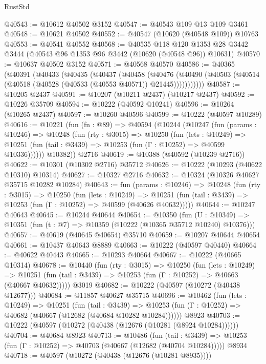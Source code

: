 \begin{lexlean}{RustStd}
\begin{coremodule}
@40543 := @10612 @40502 @3152
@40547 := @40543 @109 @13 @109 @3461
@40548 := @10621 @40502
@40552 := @40547 (@10620 (@40548 @109)) @10763
@40553 := @40541 @40552
@40568 := @40535
    @118
    @120
    @1353
    @28
    @3442
    @3444
    (@40543 @96 @1353 @96 @3442 (@10620 (@40548 @96)) @10631)
@40570 := @10637 @40502 @3152
@40571 := @40568 @40570
@40586 := @40365
    (@40391
      (@40433
        (@40435
          (@40437
            (@40458
              (@40476
                (@40490 (@40503 (@40514 (@40518 (@40528 (@40533 (@40553 @40571)) @21445)))))))))))
@40587 := @10205 @2437
@40591 := @10207 (@10211 @2437) (@10217 @2437)
@40592 := @10226 @35709
@40594 := @10222 (@40592 @10241)
@40596 := @10264 (@10265 @2437)
@40597 := @10260 @40596
@40599 := @10222 (@40597 @10289)
@40616 := @10221
    (fun (fn : @89) =>
    @40594
      (@10244
        (@10247
          (fun (params : @10246) =>
          @10248
            (fun (rty : @3015) =>
            @10250
              (fun (lets : @10249) =>
              @10251 (fun (tail : @3439) => @10253 (fun (Γ : @10252) => @40599 @10336))))))
        @10382))
    @2716
@40619 := @10388 (@40592 (@10239 @2716))
@40622 := @10301 (@10302 @2716) @35712
@40626 := @10222 (@10293 (@40622 @10310) @10314)
@40627 := @10327 @2716
@40632 := @10324 (@10326 @40627 @35715 @10282 @10284)
@40643 := fun (params : @10246) =>
  @10248
    (fun (rty : @3015) =>
    @10250
      (fun (lets : @10249) =>
      @10251 (fun (tail : @3439) => @10253 (fun (Γ : @10252) => @40599 (@40626 @40632)))))
@40644 := @10247 @40643
@40645 := @10244 @40644
@40654 := @10350
    (fun (U : @10349) => @10351 (fun (t : @7) => @10359 (@10222 (@10365 @35712 @10240) @10376)))
@40657 := @40619 (@40645 @40654) @35710
@40659 := @10207 @40644 @40654
@40661 := @10437 @40643 @8889
@40663 := @10222 (@40597 @40440)
@40664 := @40622 @40443
@40665 := @10293 @40664
@40667 := @10222 (@40665 @10314)
@40678 := @10440
    (fun (rty : @3015) =>
    @10250
      (fun (lets : @10249) =>
      @10251 (fun (tail : @3439) => @10253 (fun (Γ : @10252) => @40663 (@40667 @40632)))))
    @3019
@40682 := @10222 (@40597 (@10272 (@40438 @12677)))
@40684 := @11857 @40627 @35715
@40696 := @10462
    (fun (lets : @10249) =>
    @10251
      (fun (tail : @3439) =>
      @10253 (fun (Γ : @10252) => @40682 (@40667 (@12682 (@40684 @10282 @10284))))))
    @8923
@40703 := @10222 (@40597 (@10272 (@40438 (@12676 (@10281 (@8924 @10284))))))
@40704 := @40684 @8923
@40713 := @10486
    (fun (tail : @3439) => @10253 (fun (Γ : @10252) => @40703 (@40667 (@12682 (@40704 @10284)))))
    @8934
@40718 := @40597 (@10272 (@40438 (@12676 (@10281 @8935))))

\end{coremodule}
\end{lexlean}
